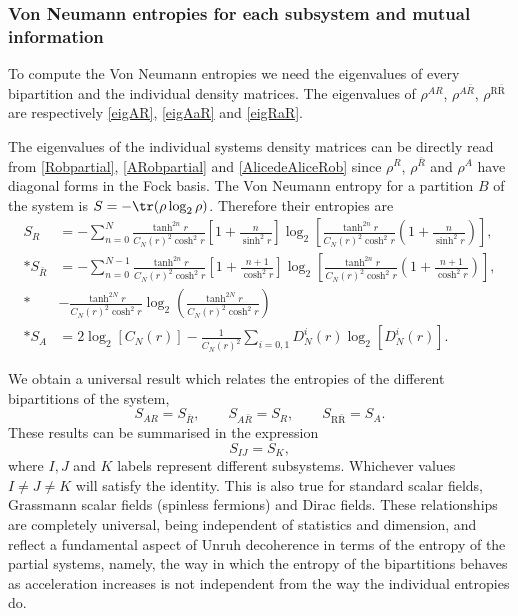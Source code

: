 \subsubsection{Von Neumann entropies for each subsystem and mutual information}

To compute the Von Neumann entropies we need the eigenvalues of every bipartition and the individual density matrices. The eigenvalues of $\rho^{AR}$, $\rho^{A\bar R}$, $\rho^{\text{R}{\bar{\text{R}}}}$ are respectively \eqref{eigAR}, \eqref{eigAaR} and \eqref{eigRaR}.

The eigenvalues of the individual systems density matrices can be directly read from \eqref{Robpartial}, \eqref{ARobpartial} and \eqref{AlicedeAliceRob} since $\rho^R$, $\rho^{\bar R}$ and $\rho^A$ have diagonal forms in the Fock basis. The Von Neumann entropy for a partition $B$ of the system is $S=-\tr(\rho\log_2\rho)$. Therefore their entropies are
\begin{align}\label{entropARaR}
\nonumber S_{R}&=-\sum_{n=0}^{N}\frac{\tanh^{2n}r}{C_N(r)^2\cosh^2r}\left[1+\frac{n}{\sinh^2r}\right]\log_2\left[\frac{\tanh^{2n}r}{C_N(r)^2\cosh^2r }\left(1+\frac{n}{\sinh^2r}\right)\right],\\*
\nonumber S_{\bar R}&=-\sum_{n=0}^{N-1}\frac{\tanh^{2n}r}{C_N(r)^2\cosh^2r}\left[1+\frac{n+1}{\cosh^2r}\right]\log_2\left[\frac{\tanh^{2n}r}{C_N(r)^2\cosh^2r }\left(1+\frac{n+1}{\cosh^2r}\right)\right],\\*
\nonumber&-\frac{\tanh^{2N}r}{C_N(r)^2\cosh^2r }\log_2\left(\frac{\tanh^{2N}r}{C_N(r)^2\cosh^2r}\right)\\*
S_A&=2\log_2\left[C_N(r)\right]-\frac{1}{C_N(r)^2}\sum_{i=0,1}D^i_N(r)\log_2\left[D^i_N(r)\right].
\end{align}

We obtain a universal result which relates the entropies of the different bipartitions of the system, 
\begin{equation}
S_{AR}=S_{\bar R},\qquad S_{A\bar R}=S_R,\qquad S_{\text{R}{\bar{\text{R}}}}= S_A.
\end{equation}  
These results can be summarised in the expression
\begin{equation}
S_{IJ}=S_K,
\end{equation}
where $I,J$ and $K$ labels represent different subsystems. Whichever values $I\neq J\neq K$ will satisfy the identity. This is also true for standard scalar fields, Grassmann scalar fields (spinless fermions) and Dirac fields. These relationships are completely universal, being independent of statistics and dimension, and reflect a fundamental aspect of Unruh decoherence in terms of the entropy of the partial systems, namely,  the way in which the entropy of the bipartitions behaves as acceleration increases  is not independent from the way the individual entropies do. 

